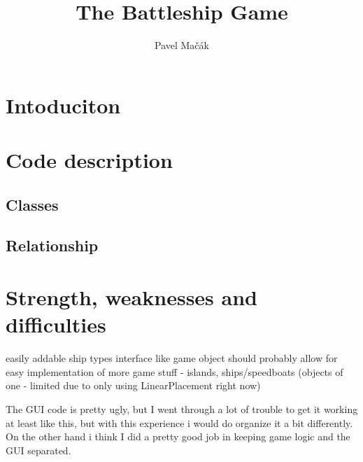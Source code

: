 \documentclass[]{report}
\title{The Battleship Game}
\author{Pavel Mačák}
\begin{document}
\maketitle
\newpage

\section{Intoduciton}

\section{Code description}

\subsection{Classes}
\subsection{Relationship}

\section{Strength, weaknesses and difficulties}
easily addable ship types
interface like game object should probably allow for easy implementation of more game stuff - islands, ships/speedboats (objects of one - limited due to only using LinearPlacement right now)

The GUI code is pretty ugly, but I went through a lot of trouble to get it working at least like this, but with this experience i would do organize it a bit differently. On the other hand i think I did a pretty good job in keeping game logic and the GUI separated. 
\end{document}
